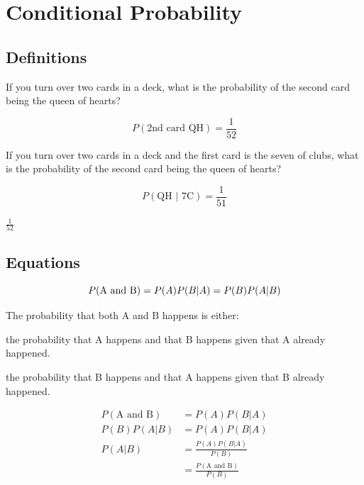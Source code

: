 \documentclass[letterpaper, landscape]{exam}
\begin{document}
  \section{Conditional Probability}

  \subsection{Definitions}
  If you turn over two cards in a deck, what is the probability of the second
  card being the queen of hearts?

  \begin{solution}
    \[
      P(\text{2nd card QH}) = \frac{1}{52}
    \]
  \end{solution}

  If you turn over two cards in a deck and the first card is the seven of clubs,
  what is the probability of the second card being the queen of hearts?

  \begin{solution}
    \[
      P(\text{QH } | \text{ 7C}) = \frac{1}{51}
    \]
  \end{solution}

  \begin{solution}
    $\frac{1}{52}$
  \end{solution}

  \subsection{Equations}
  \[
    P(\text{A and B}) = P(A) P(B | A) = P(B) P(A | B) \\
  \]

  The probability that both A and B happens is either:
  \begin{itemize*}
    \item the probability that A happens and that B happens given that A already
      happened.
    \item the probability that B happens and that A happens given that B already 
      happened.
  \end{itemize*}

  \begin{align*}
    P(\text{A and B}) & = P(A) P(B | A) \\
    P(B) P(A | B)     & = P(A) P(B | A) \\
    P(A | B)          & = \frac{P(A) P(B | A)}{P(B)} \\
                      & = \frac{P(\text{A and B})}{P(B)} \\
  \end{align*}
\end{document}
